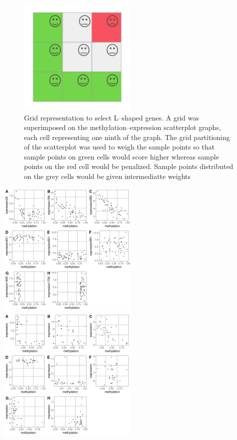 \documentclass[10pt,letterpaper]{article}
\begin{document}
\begin{figure}
\hypertarget{id}{%
\centering
\includegraphics[width=0.5\textwidth,height=1\textheight]{figures/Figure2.png}
\caption{Grid representation to select L--shaped genes. A grid was
superimposed on the methylation--expression scatterplot graphs, each
cell representing one ninth of the graph. The grid partitioning of the
scatterplot was used to weigh the sample points so that sample points on
green cells would score higher whereas sample points on the red cell
would be penalized. Sample points distributed on the grey cells would be
given intermediatte weights}\label{id}
}
\end{figure}

\includegraphics[width=0.5\textwidth,height=5\textheight]{figures/Figure3.png}
\includegraphics[width=0.5\textwidth,height=5\textheight]{figures/Figure4.png}
\end{document}
